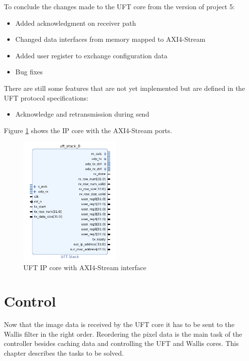 To conclude the changes made to the UFT core from the version of project 5:
\begin{itemize}
  \item Added acknowledgment on receiver path
  \item Changed data interfaces from memory mapped to AXI4-Stream
  \item Added user register to exchange configuration data
  \item Bug fixes
\end{itemize}

There are still some features that are not yet implemented but are defined in
the UFT protocol specifications:
\begin{itemize}
  \item Acknowledge and retransmission during send
\end{itemize}

Figure \ref{fig:uftipcoreaxistream} shows the IP core with the AXI4-Stream
ports.

\begin{figure}[b!]
    \centering
    \includegraphics[width=0.45\textwidth] {images/dataflow/uftcorestream.png}
    \caption{UFT IP core with AXI4-Stream interface}
    \label{fig:uftipcoreaxistream}
\end{figure}
\section{Control} \label{ch:control}
Now that the image data is received by the UFT core it has to be sent to the
Wallis filter in the right order. Reordering the pixel data is the main task of
the controller besides caching data and controlling the UFT and Wallis cores.
This chapter describes the tasks to be solved.

